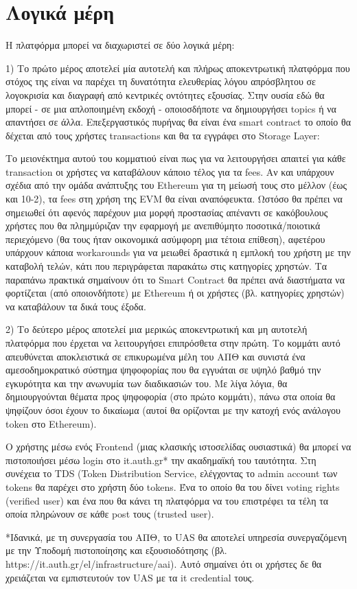 \section{Λογικά μέρη}

Η πλατφόρμα μπορεί να διαχωριστεί σε δύο λογικά μέρη:

1) Το πρώτο μέρος αποτελεί μία αυτοτελή και πλήρως αποκεντρωτική πλατφόρμα που στόχος της είναι να παρέχει τη δυνατότητα ελευθερίας λόγου απρόσβλητου σε λογοκρισία και διαγραφή από κεντρικές οντότητες εξουσίας. Στην ουσία εδώ θα μπορεί - σε μια απλοποιημένη εκδοχή - οποιοσδήποτε να δημιουργήσει topics ή να απαντήσει σε άλλα. Επεξεργαστικός πυρήνας θα είναι ένα smart contract το οποίο θα δέχεται από τους χρήστες transactions και θα τα εγγράφει στο Storage Layer:


Το μειονέκτημα αυτού του κομματιού είναι πως για να λειτουργήσει απαιτεί για κάθε \textenglish{transaction} οι χρήστες να καταβάλουν κάποιο τέλος για τα fees. Αν και υπάρχουν σχέδια από την ομάδα ανάπτυξης του Ethereum για τη μείωσή τους στο μέλλον (έως και 10-2), τα fees στη χρήση της EVM θα είναι αναπόφευκτα. Ωστόσο θα πρέπει να σημειωθεί ότι αφενός παρέχουν μια μορφή προστασίας απέναντι σε κακόβουλους χρήστες που θα πλημμύριζαν την εφαρμογή με ανεπιθύμητο ποσοτικά/ποιοτικά περιεχόμενο (θα τους ήταν οικονομικά ασύμφορη μια τέτοια επίθεση), αφετέρου υπάρχουν κάποια workarounds για να μειωθεί δραστικά η εμπλοκή του χρήστη με την καταβολή τελών, κάτι που περιγράφεται παρακάτω στις κατηγορίες χρηστών. Τα παραπάνω πρακτικά σημαίνουν ότι το Smart Contract θα πρέπει ανά διαστήματα να φορτίζεται (από οποιονδήποτε) με Ethereum ή οι χρήστες (βλ. κατηγορίες χρηστών) να καταβάλουν τα δικά τους έξοδα.

2) Το δεύτερο μέρος αποτελεί μια μερικώς αποκεντρωτική και μη αυτοτελή πλατφόρμα που έρχεται να λειτουργήσει επιπρόσθετα στην πρώτη. Το κομμάτι αυτό απευθύνεται αποκλειστικά σε επικυρωμένα μέλη του ΑΠΘ και συνιστά ένα αμεσοδημοκρατικό σύστημα ψηφοφορίας που θα εγγυάται σε υψηλό βαθμό την εγκυρότητα και την ανωνυμία των διαδικασιών του. Με λίγα λόγια, θα δημιουργούνται θέματα προς ψηφοφορία (στο πρώτο κομμάτι), πάνω στα οποία θα ψηφίζουν όσοι έχουν το δικαίωμα (αυτοί θα ορίζονται με την κατοχή ενός ανάλογου token στο Ethereum).


O χρήστης μέσω ενός Frontend (μιας κλασικής ιστοσελίδας ουσιαστικά) θα μπορεί να πιστοποιήσει μέσω login στο it.auth.gr* την ακαδημαϊκή του ταυτότητα. Στη συνέχεια το TDS (Token Distribution Service, ελέγχοντας το admin account των tokens θα παρέχει στο χρήστη δύο tokens.  Ένα το οποίο θα του δίνει voting rights (verified user) και ένα που θα κάνει τη πλατφόρμα να του επιστρέφει τα τέλη τα οποία πληρώνουν σε κάθε post τους (trusted user).


*Ιδανικά, με τη συνεργασία του ΑΠΘ, το UAS θα αποτελεί υπηρεσία συνεργαζόμενη με την Υποδομή πιστοποίησης και εξουσιοδότησης (βλ. https://it.auth.gr/el/infrastructure/aai). Αυτό σημαίνει ότι οι χρήστες δε θα χρειάζεται να εμπιστευτούν τον UAS με τα it credential τους.
